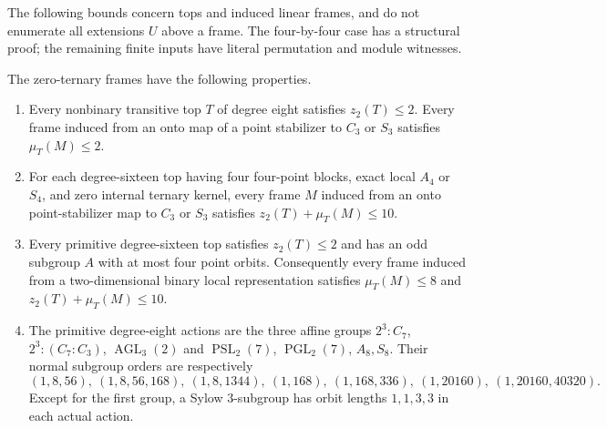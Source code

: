 The following bounds concern tops and induced linear frames,
and do not enumerate all extensions $U$ above a frame. The
four-by-four case has a structural proof; the remaining finite
inputs have literal permutation and module witnesses.
\begin{lemma}\label{lem:finite-zero-frames}
The zero-ternary frames have the following properties.
\begin{enumerate}[label=(\roman*)]
\item Every nonbinary transitive top $T$ of degree eight satisfies
$z_2(T)\leq2$. Every frame induced from an onto map of a point
stabilizer to $C_3$ or $S_3$ satisfies $\mu_T(M)\leq2$.
\item For each degree-sixteen top having four four-point blocks,
exact local $A_4$ or $S_4$, and zero internal ternary kernel,
every frame $M$ induced from an onto point-stabilizer map to
$C_3$ or $S_3$ satisfies $z_2(T)+\mu_T(M)\leq10$.
\item Every primitive degree-sixteen top satisfies $z_2(T)\leq2$
and has an odd subgroup $A$ with at most four point orbits.
Consequently every frame induced from a two-dimensional binary local
representation satisfies $\mu_T(M)\leq8$ and
$z_2(T)+\mu_T(M)\leq10$.
\item The primitive degree-eight actions are the three affine groups
$2^3:C_7$, $2^3:(C_7:C_3)$, $\operatorname{AGL}_3(2)$ and
$\operatorname{PSL}_2(7)$, $\operatorname{PGL}_2(7)$, $A_8,S_8$.
Their normal subgroup orders are respectively
\[
 (1,8,56),\ (1,8,56,168),\ (1,8,1344),\ (1,168),\
 (1,168,336),\ (1,20160),\ (1,20160,40320).
\]
Except for the first group, a Sylow $3$-subgroup has orbit lengths
$1,1,3,3$ in each actual action.
\end{enumerate}
\end{lemma}
